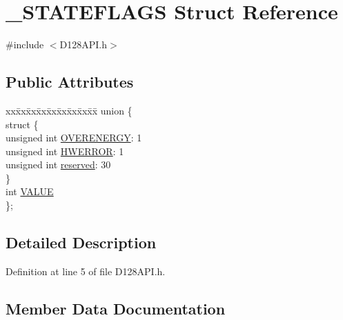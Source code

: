 \hypertarget{struct___s_t_a_t_e_f_l_a_g_s}{}\section{\+\_\+\+S\+T\+A\+T\+E\+F\+L\+A\+GS Struct Reference}
\label{struct___s_t_a_t_e_f_l_a_g_s}


{\ttfamily \#include $<$D128\+A\+P\+I.\+h$>$}

\subsection*{Public Attributes}
\begin{DoxyCompactItemize}
\item 
\begin{tabbing}
xx\=xx\=xx\=xx\=xx\=xx\=xx\=xx\=xx\=\kill
union \{\\
\>struct \{\\
\>\>unsigned int \hyperlink{struct___s_t_a_t_e_f_l_a_g_s_ae0e9876a31f0e02a9b95e35c7964329b}{OVERENERGY}: 1\\
\>\>unsigned int \hyperlink{struct___s_t_a_t_e_f_l_a_g_s_aacbcd74f712daaeab0866ccdcfa8a31a}{HWERROR}: 1\\
\>\>unsigned int \hyperlink{struct___s_t_a_t_e_f_l_a_g_s_a04086b338888e6aeb8ec87f36dfc3b8f}{reserved}: 30\\
\>\} \\
\>int \hyperlink{struct___s_t_a_t_e_f_l_a_g_s_aeafe01c8bbda4ee95f71c151ecc948b7}{VALUE}\\
\}; \\

\end{tabbing}\end{DoxyCompactItemize}


\subsection{Detailed Description}


Definition at line 5 of file D128\+A\+P\+I.\+h.



\subsection{Member Data Documentation}
\mbox{\label{struct___s_t_a_t_e_f_l_a_g_s_ac5e832eeabd871f2cd0eddeb45cd66ef}} 
